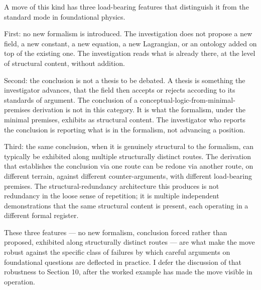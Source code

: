 \documentclass[11pt,a4paper]{article}
\begin{document}
A move of this kind has three load-bearing features that distinguish it from the standard mode in foundational physics.

First: no new formalism is introduced. The investigation does not propose a new field, a new constant, a new equation, a new Lagrangian, or an ontology added on top of the existing one. The investigation reads what is already there, at the level of structural content, without addition.

Second: the conclusion is not a thesis to be debated. A thesis is something the investigator advances, that the field then accepts or rejects according to its standards of argument. The conclusion of a conceptual-logic-from-minimal-premises derivation is not in this category. It is what the formalism, under the minimal premises, exhibits as structural content. The investigator who reports the conclusion is reporting what is in the formalism, not advancing a position.

Third: the same conclusion, when it is genuinely structural to the formalism, can typically be exhibited along multiple structurally distinct routes. The derivation that establishes the conclusion via one route can be redone via another route, on different terrain, against different counter-arguments, with different load-bearing premises. The structural-redundancy architecture this produces is not redundancy in the loose sense of repetition; it is multiple independent demonstrations that the same structural content is present, each operating in a different formal register.

These three features --- no new formalism, conclusion forced rather than proposed, exhibited along structurally distinct routes --- are what make the move robust against the specific class of failures by which careful arguments on foundational questions are deflected in practice. I defer the discussion of that robustness to Section 10, after the worked example has made the move visible in operation.
\end{document}
